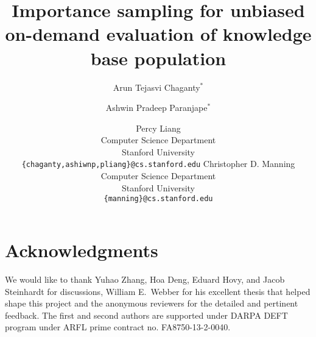 \documentclass[11pt,letterpaper]{article}
\title{Importance sampling for unbiased on-demand evaluation of knowledge base population}
\author{%
  Arun Tejasvi Chaganty$^*$
\and%
  Ashwin Pradeep Paranjape$^*$
\and%
  Percy Liang
  \\
  Computer Science Department \\
  Stanford University \\
  {\tt \{chaganty,ashiwnp,pliang\}@cs.stanford.edu}
\AND%
  Christopher D. Manning \\
  Computer Science Department \\
  Stanford University \\
  {\tt \{manning\}@cs.stanford.edu}
}
\date{}
\begin{document}
\maketitle

\begin{abstract}

\end{abstract}










\section*{Acknowledgments}
We would like to thank Yuhao Zhang, Hoa Deng, Eduard Hovy, and Jacob Steinhardt for discussions, William E.\ Webber for his excellent thesis that helped shape this project and the anonymous reviewers for the detailed and pertinent feedback.
The first and second authors are supported under DARPA DEFT program under ARFL prime contract no. FA8750-13-2-0040.




\appendix


\end{document}
